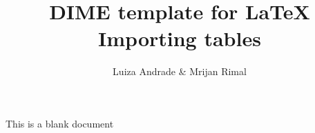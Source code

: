 \documentclass{article}                 %
\title{DIME template for \LaTeX \\ Importing tables} 	%
\author{Luiza Andrade \& Mrijan Rimal}
\begin{document}

	This is a blank document
\end{document}
